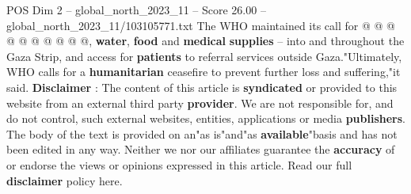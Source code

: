 \begin{textsample}{POS Dim 2 – global\_north\_2023\_11 – Score 26.00 – global\_north\_2023\_11/103105771.txt}
The WHO maintained its call for @ @ @ @ @ @ @ @ @ @, \textbf{water}, \textbf{food} and \textbf{medical} \textbf{supplies} -- into and throughout the Gaza Strip, and access for \textbf{patients} to referral services outside Gaza."Ultimately, WHO calls for a \textbf{humanitarian} ceasefire to prevent further loss and suffering,"it said. \textbf{Disclaimer} : The content of this article is \textbf{syndicated} or provided to this website from an external third party \textbf{provider}.
We are not responsible for, and do not control, such external websites, entities, applications or media \textbf{publishers}.
The body of the text is provided on an"as is"and"as \textbf{available}"basis and has not been edited in any way.
Neither we nor our affiliates guarantee the \textbf{accuracy} of or endorse the views or opinions expressed in this article.
Read our full \textbf{disclaimer} policy here.

\end{textsample}
